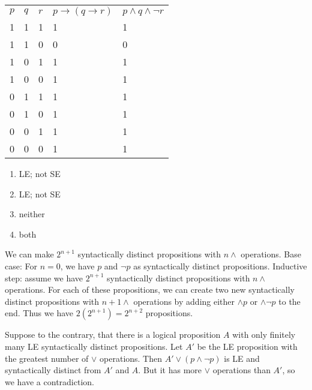 \documentclass[solution, letterpaper]{cs20}
\begin{document}
\begin{solution}

\subsolution 

\begin{table}[h]
\centering
\label{my-label}
\begin{tabular}{lllll}
$p$ & $q$ & $r$& $p \to (q \to r)$ & $p \land q \land \neg r$ \\
1 & 1 & 1 & 1               & 1                      \\
1 & 1 & 0 & 0               & 0                      \\
1 & 0 & 1 & 1               & 1                      \\
1 & 0 & 0 & 1               & 1                      \\
0 & 1 & 1 & 1               & 1                      \\
0 & 1 & 0 & 1               & 1                      \\
0 & 0 & 1 & 1               & 1                      \\
0 & 0 & 0 & 1               & 1                     
\end{tabular}
\end{table}

\subsolution

\begin{enumerate}
\item LE; not SE
\item LE; not SE
\item neither
\item both
\end{enumerate}

\subsolution We can make $2^{n+1}$ syntactically distinct propositions with $n \land$ operations. Base case: For $n = 0$, we have $p$ and $\neg p$ as syntactically distinct propositions. Inductive step: assume we have $2^{n+1}$ syntactically distinct propositions with $n \land$ operations. For each of these propositions, we can create two new syntactically distinct propositions with $n+1 \land$ operations by adding either $\land p$ or $\land \neg p$ to the end. Thus we have $2(2^{n+1}) = 2^{n+2}$ propositions.

\subsolution Suppose to the contrary, that there is a logical proposition $A$ with only finitely many LE syntactically distinct propositions. Let $A'$ be the LE proposition with the greatest number of $\lor$ operations. Then $A' \lor (p \land \neg p)$ is LE and syntactically distinct from $A'$ and $A$. But it has more $\lor$ operations than $A'$, so we have a contradiction.

\end{solution}
\end{document}
